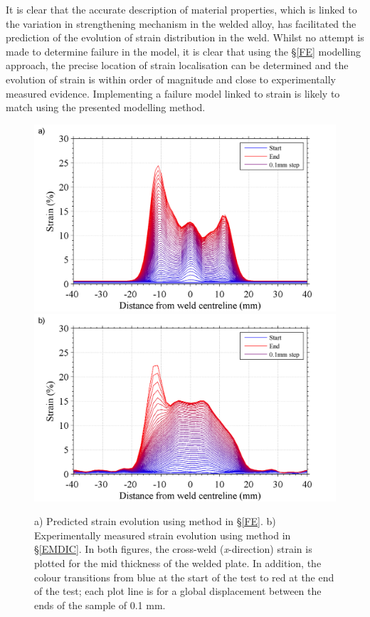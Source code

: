 It is clear that the accurate description of material properties, which is linked to the variation in strengthening mechanism in the welded alloy, has facilitated the prediction of the evolution of strain distribution in the weld. Whilst no attempt is made to determine failure in the model, it is clear that using the \S\ref{FE} modelling approach, the precise location of strain localisation can be determined and the evolution of strain is within order of magnitude and close to experimentally measured evidence. Implementing a failure model linked to strain is likely to match using the presented modelling method.
\begin{figure}[h!]
	\centering
	\includegraphics[width=1\linewidth]{PredictedXstrainaltered}		\includegraphics[width=1\linewidth]{DICcrossweldStrainaltered}
	\caption[Mesh]{a) Predicted strain evolution using method in \S\ref{FE}. b) Experimentally measured strain evolution using method in \S\ref{EMDIC}. In both figures, the cross-weld (\textit{x}-direction) strain is plotted for the mid thickness of the welded plate. In addition, the colour transitions from blue at the start of the test to red at the end of the test; each plot line is for a global displacement between the ends of the sample of 0.1 mm.}
	\label{fig:UniaxialStrainPredicted}	
\end{figure} 

